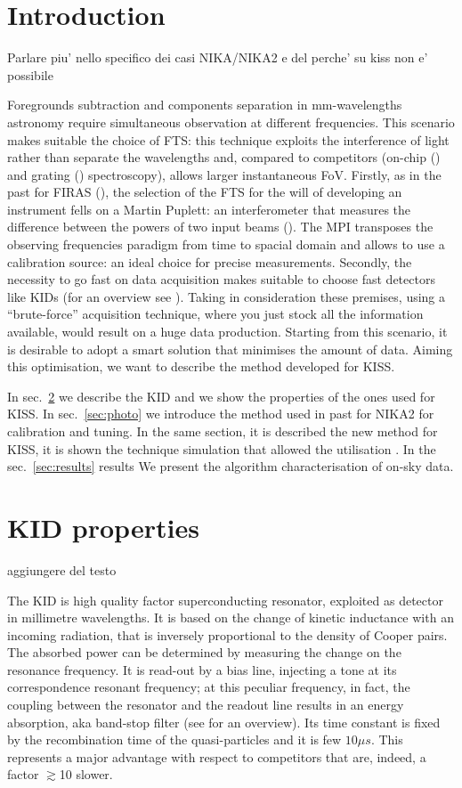\documentclass[twocolumn,traditabstract]{aa}\\
\begin{document}
\section{Introduction}

\cite{fasano-ltd} \cite{fasano-nika2}
Parlare piu' nello specifico dei casi NIKA/NIKA2 e del perche' su kiss non e' possibile

Foregrounds subtraction and components separation in mm-wavelengths astronomy require simultaneous observation at different frequencies. This scenario makes suitable the choice of FTS: this technique exploits the interference of light rather than separate the wavelengths and, compared to competitors (on-chip (\cite{deshima}) and grating (\cite{grating}) spectroscopy), allows larger instantaneous FoV.
Firstly, as in the past for FIRAS (\cite{FIRAS}), the selection of the FTS for the will of developing an instrument fells on a Martin Puplett: an interferometer that measures the difference between the powers of two input beams (\cite{mpi}). The MPI transposes the observing frequencies paradigm from time to spacial domain and allows to use a calibration source: an ideal choice for precise measurements.
Secondly, the necessity to go fast on data acquisition makes suitable to choose fast detectors like KIDs (for an overview see \cite{kids}). Taking in consideration these premises, using a ``brute-force'' acquisition technique, where you just stock all the information available, would result on a huge data production. Starting from this scenario, it is desirable to adopt a smart solution that minimises the amount of data.
Aiming this optimisation, we want to describe the method developed for KISS.

In sec.~\ref{sec:kid} we describe the KID and we show the properties of the ones used for KISS. 
In sec.~\ref{sec:photo} we introduce the method used in past for NIKA2 for calibration and tuning. In the same section, it is described the new method for KISS, it is shown the technique simulation that allowed the utilisation . 
In the sec.~\ref{sec:results}  results We present the algorithm characterisation of on-sky data.

\section{KID properties}
\label{sec:kid}
aggiungere del testo 

The KID is high quality factor superconducting resonator, exploited as detector in millimetre wavelengths. It is based on the change of kinetic inductance with an incoming radiation, that is inversely proportional to the density of Cooper pairs. The absorbed power can be determined by measuring the change on the resonance frequency.  It is read-out by a bias line, injecting a tone at its correspondence resonant frequency; at this peculiar frequency, in fact, the coupling between the resonator and the readout line results in an energy absorption, aka band-stop filter (see \cite{Zmuidzinas} for an overview). Its time constant is fixed by the recombination time of the quasi-particles and it is few $10 \mu s$. This represents a major advantage with respect to competitors that are, indeed, a factor $\gtrsim$10 slower.
\end{document}
